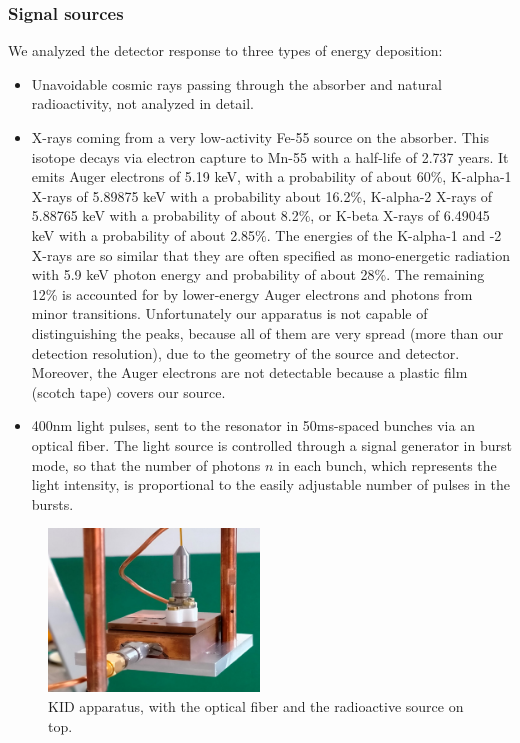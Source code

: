 \documentclass[12pt]{article}
\begin{document}
\subsubsection{Signal sources}
We analyzed the detector response to three types of energy deposition:
\begin{itemize}
\item Unavoidable cosmic rays passing through the absorber and natural radioactivity, not analyzed in detail.
\item X-rays coming from a very low-activity Fe-55 source on the absorber. This isotope decays via electron capture to Mn-55 with a half-life of 2.737 years. It emits Auger electrons of 5.19 keV, with a probability of about 60\%, K-alpha-1 X-rays of 5.89875 keV with a probability about 16.2\%, K-alpha-2 X-rays of 5.88765 keV with a probability of about 8.2\%, or K-beta X-rays of 6.49045 keV with a probability of about 2.85\%. The energies of the K-alpha-1 and -2 X-rays are so similar that they are often specified as mono-energetic radiation with 5.9 keV photon energy and probability of about 28\%. The remaining 12\% is accounted for by lower-energy Auger electrons and photons from minor transitions. Unfortunately our apparatus is not capable of distinguishing the peaks, because all of them are very spread (more than our detection resolution), due to the geometry of the source and detector. Moreover, the Auger electrons are not detectable because a plastic film (scotch tape) covers our source.
\item 400nm light pulses, sent to the resonator in 50ms-spaced bunches via an optical fiber. The light source is controlled through a signal generator in burst mode, so that the number of photons $n$ in each bunch, which represents the light intensity, is proportional to the easily adjustable number of pulses in the bursts.
\end{itemize}
\begin{figure}[H] 
        \centering \includegraphics[width=0.5\textwidth]{kid_fibra.jpg}
        \caption{
               KID apparatus, with the optical fiber and the radioactive source on top.
        }
\end{figure}
\end{document}
